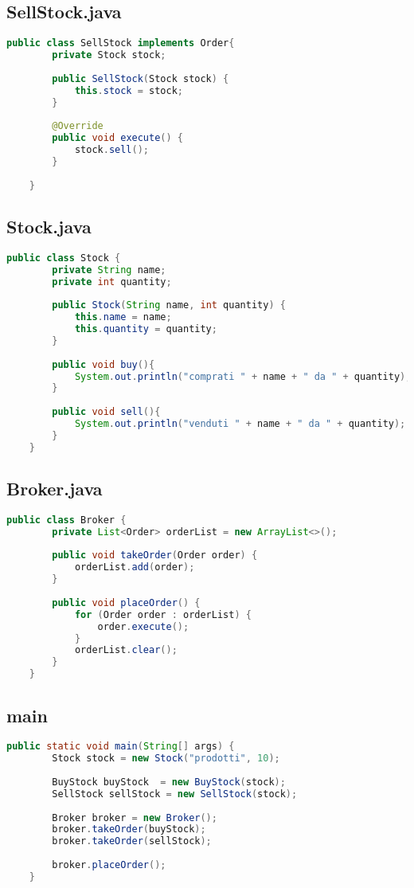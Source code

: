 \subsection{SellStock.java}
\begin{lstlisting}[language=java]
    public class SellStock implements Order{
        private Stock stock;
    
        public SellStock(Stock stock) {
            this.stock = stock;
        }
    
        @Override
        public void execute() {
            stock.sell();
        }
        
    }
\end{lstlisting}

\subsection{Stock.java}
\begin{lstlisting}[language=java]
    public class Stock {
        private String name;
        private int quantity;
    
        public Stock(String name, int quantity) {
            this.name = name;
            this.quantity = quantity;
        }
    
        public void buy(){
            System.out.println("comprati " + name + " da " + quantity);
        }
    
        public void sell(){
            System.out.println("venduti " + name + " da " + quantity);
        }
    }
\end{lstlisting}

\subsection{Broker.java}
\begin{lstlisting}[language=java]
    public class Broker {
        private List<Order> orderList = new ArrayList<>();
    
        public void takeOrder(Order order) {
            orderList.add(order);
        }
    
        public void placeOrder() {
            for (Order order : orderList) {
                order.execute();
            }
            orderList.clear();
        }
    }
\end{lstlisting}

\subsection{main}
\begin{lstlisting}[language=java]
    public static void main(String[] args) {
        Stock stock = new Stock("prodotti", 10);
    
        BuyStock buyStock  = new BuyStock(stock);
        SellStock sellStock = new SellStock(stock);
    
        Broker broker = new Broker();
        broker.takeOrder(buyStock);
        broker.takeOrder(sellStock);
    
        broker.placeOrder();
    }
\end{lstlisting}